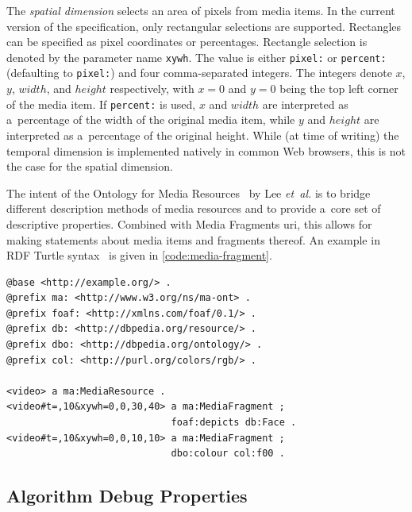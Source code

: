 The \emph{spatial dimension} selects an area of pixels from media items.
In the current version of the specification,
only rectangular selections are supported.
Rectangles can be specified as pixel coordinates or percentages.
Rectangle selection is denoted by the parameter name \texttt{xywh}.
The value is either \texttt{pixel:} or \texttt{percent:}
(defaulting to \texttt{pixel:}) and four comma-separated integers.
The integers denote $x$, $y$, $width$, and $height$ respectively,
with $x = 0$ and $y = 0$ being the top left corner of the media item.
If \texttt{percent:} is used,
$x$ and $width$ are interpreted as a~percentage of the width of the original media item,
while $y$ and $height$ are interpreted as a~percentage of the original height.
While (at time of writing) the temporal dimension is implemented natively
in common Web browsers, this is not the case for the spatial dimension.

The intent of the Ontology for Media Resources~\cite{lee2012mediaontology}
by Lee \emph{et~al.} is to bridge different description methods of media resources
and to provide a~core set of descriptive properties.
Combined with Media Fragments {\sc uri}, this allows for making statements
about media items and fragments thereof.
An example in RDF Turtle syntax~\cite{prudhommeaux2013turtle}
is given in \autoref{code:media-fragment}.

\begin{lstlisting}[caption={[Description of two 10~sec long media fragments]{Description of two 10~sec long media fragments:
  \textit{(i)}~a~tile of dimensions $ 30 \times 40 $ pixels
  starting at pixel coordinates $ (0, 0) $
  that contains a~face; and
  \textit{(ii)}~a~tile of dimensions $ 10 \times 10 $ pixels
  starting at pixel coordinates $ (0, 0) $ of red color}},
  label=code:media-fragment, float=!ht]
@base <http://example.org/> .
@prefix ma: <http://www.w3.org/ns/ma-ont> .
@prefix foaf: <http://xmlns.com/foaf/0.1/> .
@prefix db: <http://dbpedia.org/resource/> .
@prefix dbo: <http://dbpedia.org/ontology/> .
@prefix col: <http://purl.org/colors/rgb/> .

<video> a ma:MediaResource .
<video#t=,10&xywh=0,0,30,40> a ma:MediaFragment ;
                             foaf:depicts db:Face .
<video#t=,10&xywh=0,0,10,10> a ma:MediaFragment ;
                             dbo:colour col:f00 .
\end{lstlisting}

\subsection{Algorithm Debug Properties}
\label{sec:media-item-deduplication-algorithm}

